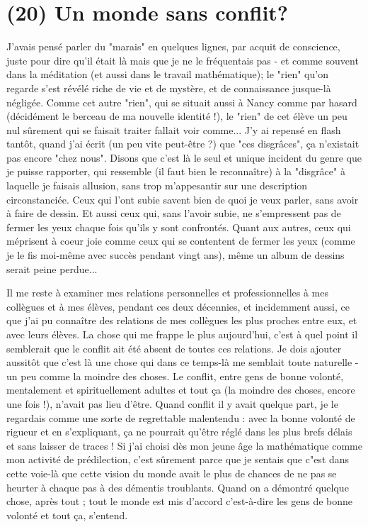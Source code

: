 \section{(20) Un monde sans conflit?}

J'avais pensé parler du "marais" en quelques lignes, par acquit de conscience, juste pour dire qu'il était là mais que je ne le fréquentais pas - et comme souvent dans la méditation (et aussi dans le travail mathématique); le "rien" qu'on regarde s'est révélé riche de vie et de mystère, et de connaissance jusque-là négligée. Comme cet autre "rien", qui se situait aussi à Nancy comme par hasard (décidément le berceau de ma nouvelle identité !), le "rien" de cet élève un peu nul sûrement qui se faisait traiter fallait voir comme... J'y ai repensé en flash tantôt, quand j'ai écrit (un peu vite peut-être ?) que "ces disgrâces", ça n'existait pas encore "chez nous". Disons que c'est là le seul et unique incident du genre que je puisse rapporter, qui ressemble (il faut bien le reconnaître) à la "disgrâce" à laquelle je faisais allusion, sans trop m’appesantir sur une description circonstanciée. Ceux qui l'ont subie savent bien de quoi je veux parler, sans avoir à faire de dessin. Et aussi ceux qui, sans l'avoir subie, ne s'empressent pas de fermer les yeux chaque fois qu'ils y sont confrontés. Quant aux autres, ceux qui méprisent à coeur joie comme ceux qui se contentent de fermer les yeux (comme je le fis moi-même avec succès pendant vingt ans), même un album de dessins serait peine perdue...

Il me reste à examiner mes relations personnelles et professionnelles à mes collègues et à mes élèves, pendant ces deux décennies, et incidemment aussi, ce que j'ai pu connaître des relations de mes collègues les plus proches entre eux, et avec leurs élèves. La chose qui me frappe le plus aujourd'hui, c'est à quel point il semblerait que le conflit ait été absent de toutes ces relations. Je dois ajouter aussitôt que c'est là une chose qui dans ce temps-là me semblait toute naturelle - un peu comme la moindre des choses. Le conflit, entre gens de bonne volonté, mentalement et spirituellement adultes et tout ça (la moindre des choses, encore une fois !), n'avait pas lieu d'être. Quand conflit il y avait quelque part, je le regardais comme une sorte de regrettable malentendu : avec la bonne volonté de rigueur et en s'expliquant, ça ne pourrait qu'être réglé dans les plus brefs délais et sans laisser de traces ! Si j'ai choisi dès mon jeune âge la mathématique comme mon activité de prédilection, c'est sûrement parce que je sentais que c"est dans cette voie-là que cette vision du monde avait le plus de chances de ne pas se heurter à chaque pas à des démentis troublants. Quand on a démontré quelque chose, après tout ; tout le monde est mis d'accord c'est-à-dire les gens de bonne volonté et tout ça, s'entend.

